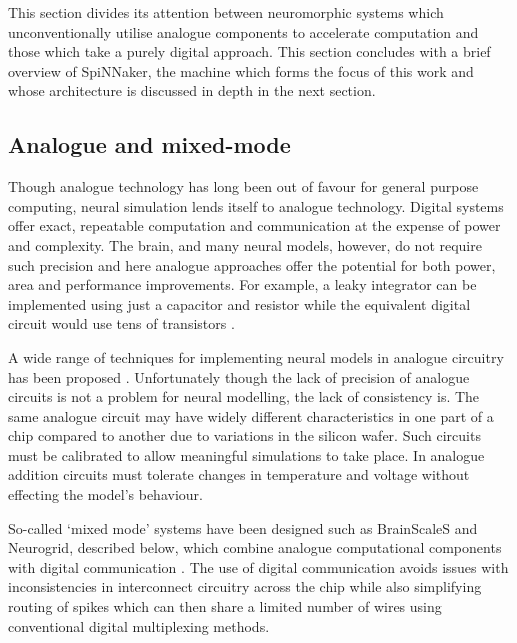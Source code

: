 		This section divides its attention between neuromorphic systems which
		unconventionally utilise analogue components to accelerate computation and
		those which take a purely digital approach. This section concludes with a
		brief overview of SpiNNaker, the machine which forms the focus of this work
		and whose architecture is discussed in depth in the next section.
		
		\subsection{Analogue and mixed-mode}
			
			
			Though analogue technology has long been out of favour for general purpose
			computing, neural simulation lends itself to analogue technology.  Digital
			systems offer exact, repeatable computation and communication at the
			expense of power and complexity. The brain, and many neural models,
			however, do not require such precision and here analogue approaches offer
			the potential for both power, area and performance improvements. For
			example, a leaky integrator can be implemented using just a capacitor and
			resistor while the equivalent digital circuit would use tens of
			transistors \cite{misra10}.
			
			A wide range of techniques for implementing neural models in analogue
			circuitry has been proposed \cite{graf86,holler89,agranat90,azghadi13}.
			Unfortunately though the lack of precision of analogue circuits is not a
			problem for neural modelling, the lack of consistency is. The same
			analogue circuit may have widely different characteristics in one part of
			a chip compared to another due to variations in the silicon wafer. Such
			circuits must be calibrated to allow meaningful simulations to take place.
			In analogue addition circuits must tolerate changes in temperature and
			voltage without effecting the model's behaviour.
			
			So-called `mixed mode' systems have been designed such as BrainScaleS and
			Neurogrid, described below, which combine analogue computational
			components with digital communication \cite{maguire07,benjamin14}. The use
			of digital communication avoids issues with inconsistencies in
			interconnect circuitry across the chip while also simplifying routing of
			spikes which can then share a limited number of wires using conventional
			digital multiplexing methods.
			
